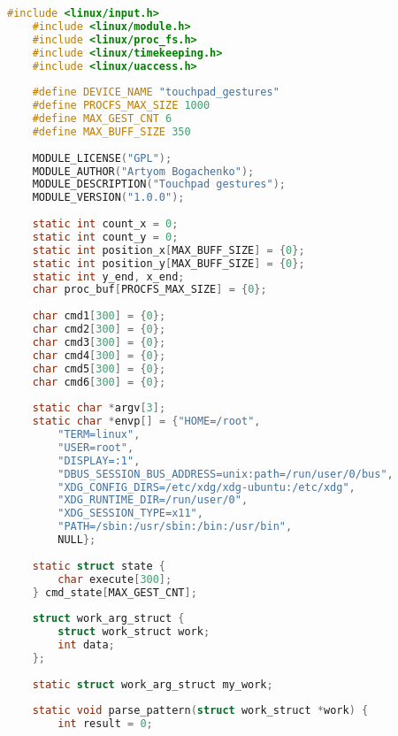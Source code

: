 \label{app:module}

\begin{lstlisting}[label=lst:module,caption=Реализация загружаемого модуля ядра, language=c]
	#include <linux/input.h>
	#include <linux/module.h>
	#include <linux/proc_fs.h>
	#include <linux/timekeeping.h>
	#include <linux/uaccess.h>
	
	#define DEVICE_NAME "touchpad_gestures"
	#define PROCFS_MAX_SIZE 1000
	#define MAX_GEST_CNT 6
	#define MAX_BUFF_SIZE 350
	
	MODULE_LICENSE("GPL");
	MODULE_AUTHOR("Artyom Bogachenko");
	MODULE_DESCRIPTION("Touchpad gestures");
	MODULE_VERSION("1.0.0");
	
	static int count_x = 0;
	static int count_y = 0;
	static int position_x[MAX_BUFF_SIZE] = {0};
	static int position_y[MAX_BUFF_SIZE] = {0};
	static int y_end, x_end;
	char proc_buf[PROCFS_MAX_SIZE] = {0};
	
	char cmd1[300] = {0};
	char cmd2[300] = {0};
	char cmd3[300] = {0};
	char cmd4[300] = {0};
	char cmd5[300] = {0};
	char cmd6[300] = {0};
	
	static char *argv[3];
	static char *envp[] = {"HOME=/root",
		"TERM=linux",
		"USER=root",
		"DISPLAY=:1",
		"DBUS_SESSION_BUS_ADDRESS=unix:path=/run/user/0/bus",
		"XDG_CONFIG_DIRS=/etc/xdg/xdg-ubuntu:/etc/xdg",
		"XDG_RUNTIME_DIR=/run/user/0",
		"XDG_SESSION_TYPE=x11",
		"PATH=/sbin:/usr/sbin:/bin:/usr/bin",
		NULL};
	
	static struct state {
		char execute[300];
	} cmd_state[MAX_GEST_CNT];
	
	struct work_arg_struct {
		struct work_struct work;
		int data;
	};
	
	static struct work_arg_struct my_work;
	
	static void parse_pattern(struct work_struct *work) {
		int result = 0;
		

\end{lstlisting}
